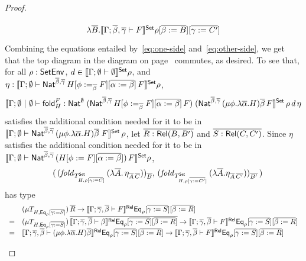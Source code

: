 \documentclass[acmsmall,review,anonymous]{acmart}
\theoremstyle{definition}
\newcommand{\set}{\mathsf{Set}}
\begin{document}
\begin{proof}
\begin{itemize}
{\begin{equation}
\begin{tikzcd}[row sep = huge]
\lambda \ol{B}.\setsem{\Gamma; \ol{\beta}, \ol{\gamma} \vdash F} \rho [\ol{\beta :=
    B}] [\ol{\gamma := C'}]
\end{tikzcd}
\end{equation}}
Combining the equations entailed by~\ref{eq:one-side}
and~\ref{eq:other-side}, we get that
the top diagram in the diagram on
  page~\pageref{page:dia1} commutes, as desired.
To see that, for all $\rho : \mathsf{SetEnv}$, $d \in
\setsem{\Gamma; \emptyset \vdash \emptyset}\rho$, and $\eta :
\setsem{\Gamma; \emptyset \vdash \Nat^{\ol{\beta},
    \ol{\gamma}}\,H[\phi :=_{\ol{\beta}} F][\ol{\alpha := \beta}]\,F}
\rho$,
\[\setsem{\Gamma; \emptyset~|~\emptyset
  \vdash \fold^F_H : \Nat^\emptyset\;(\Nat^{\ol{\beta},
    \ol{\gamma}}\,H[\phi :=_{\ol{\beta}} F][\ol{\alpha :=
      \beta}]\,F)\; (\Nat^{{\ol{\beta},\ol{\gamma}} }\,(\mu
  \phi.\lambda \overline \alpha.H)\overline \beta\,F}\,\rho\,d\,\eta\]
satisfies the additional condition needed for it to be in
$\setsem{\Gamma;\emptyset \vdash \Nat^{{\ol{\beta},\ol{\gamma}}
  }\,(\mu \phi.\lambda \overline \alpha.H)\overline \beta\;F}\,\rho$,
let $\overline{R : \mathsf{Rel}(B,B')}$ and $\overline{S : \mathsf{Rel}(C,C')}$.  Since $\eta$
satisfies the additional condition needed for it to be in
$\setsem{\Gamma; \emptyset \vdash \Nat^{\ol{\beta},
    \ol{\gamma}}\,(H[\phi := F][\ol{\alpha := \beta}])\,F} \rho$,
\[\begin{array}{ll}
 & (\,(\mathit{fold}_{T^\set_{H,\rho[\ol{\gamma :=
        C}]}}\,(\lambda \ol{A}.\,\eta_{\ol{A}\,\ol{C}}))_{\ol{B}},\,
(\mathit{fold}_{T^\set_{H,\rho[\ol{\gamma :=
        C'}]}}\,(\lambda \ol{A}.\eta_{\ol{A}\,\ol{C'}}))_{\ol{B'}}\,) 
\end{array}\]
has type
\[\begin{array}{ll}
  & (\mu T_{H,\mathsf{Eq}_\rho[\overline{\gamma := S}]}) \,\overline{R} \to
\llbracket{\Gamma;\overline{\gamma},\overline{\beta} \vdash F}\rrbracket^{\mathsf{Rel}}\mathsf{Eq}_\rho[\overline{\gamma := 
    S}][\overline{\beta:= R}]\\ 
= & (\mu T_{H,\mathsf{Eq}_\rho[\overline{\gamma :=
      S}]})\,\overline{\llbracket{\Gamma;\overline{\gamma},\overline{\beta} 
  \vdash \beta}\rrbracket^{\mathsf{Rel}}\mathsf{Eq}_\rho[\overline{\gamma := S}][\overline{\beta := R}]} \to
\llbracket{\Gamma;\overline{\gamma},\overline{\beta} \vdash F}\rrbracket^{\mathsf{Rel}}\mathsf{Eq}_\rho[\overline{\gamma := 
    S}][\overline{\beta:= R}]\\ 
= & \llbracket{\Gamma; \overline{\gamma},\overline{\beta} \vdash (\mu \phi. \lambda
  \overline{\alpha}. H)\overline{\beta}}\rrbracket^{\mathsf{Rel}}\mathsf{Eq}_\rho[\overline{\gamma := S}][\overline{\beta := R}] \to
\llbracket{\Gamma;\overline{\gamma},\overline{\beta} \vdash F}\rrbracket^{\mathsf{Rel}}\mathsf{Eq}_\rho[\overline{\gamma := 
    S}][\overline{\beta:= R}]
\end{array}\]


\end{itemize}
\end{proof}
\end{document}
